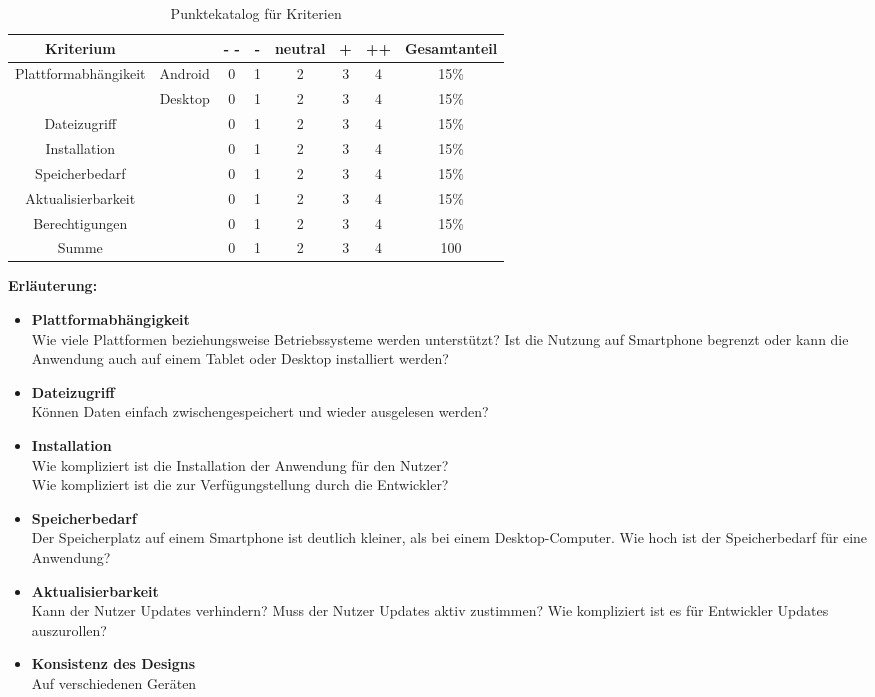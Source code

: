 \begin{table}
    \centering
    \begin{tabular}{ |c|| c|c| c| c| c| c| c|}
        \hline
        Kriterium && - - & - & neutral & + &++& Gesamtanteil \\
        \hline
    
        \multirow{2}{*}{Plattformabhängikeit} &Android& 0 & 1 & 2 & 3 & 4 & 15\%\\
        & Desktop &0 & 1 & 2 & 3 & 4 & 15\%\\
        \hline
        Dateizugriff && 0 & 1 & 2 & 3 & 4 & 15\%\\
        Installation  && 0 & 1 & 2 & 3 & 4 & 15\%\\
        Speicherbedarf && 0 & 1 & 2 & 3 & 4 & 15\%\\
        Aktualisierbarkeit  && 0 & 1 & 2 & 3 & 4 & 15\%\\
        Berechtigungen  && 0 & 1 & 2 & 3 & 4 & 15\%\\
        \hline
        \hline
        Summe && 0 & 1 & 2 & 3 & 4 & 100\\
        \hline
    \end{tabular}
    \caption{Punktekatalog für Kriterien} \label{tab:punktekatalog}
\end{table}

\textbf{Erläuterung:}
\begin{itemize}
    \item \textbf{Plattformabhängigkeit} \\
    Wie viele Plattformen beziehungsweise Betriebssysteme werden unterstützt?
    Ist die Nutzung auf Smartphone begrenzt oder kann die Anwendung auch auf einem Tablet oder Desktop installiert werden?
    \item \textbf{Dateizugriff}\\
    Können Daten einfach zwischengespeichert und wieder ausgelesen werden? 
    \item \textbf{Installation}\\
    Wie kompliziert ist die Installation der Anwendung für den Nutzer?\\
    Wie kompliziert ist die zur Verfügungstellung durch die Entwickler?
        \item \textbf{Speicherbedarf}\\
Der Speicherplatz auf einem Smartphone ist deutlich kleiner, als bei einem Desktop-Computer. Wie hoch ist der Speicherbedarf für eine Anwendung?
\item \textbf{Aktualisierbarkeit}\\
Kann der Nutzer Updates verhindern? Muss der Nutzer Updates aktiv zustimmen? Wie kompliziert ist es für Entwickler Updates auszurollen?

        \item \textbf{Konsistenz des Designs}\\
Auf verschiedenen Geräten
\end{itemize}

